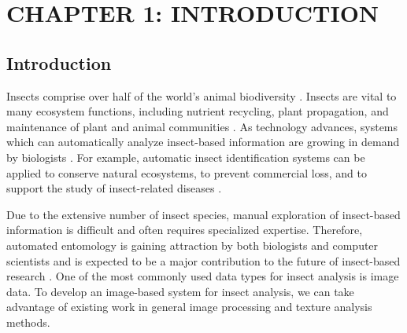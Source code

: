 \documentclass[12pt]{article}
\begin{document}
\begin{center}
    \listoffigures
\end{center}
\newpage

\begin{center}
    \listoftables
\end{center}
\newpage

\setlength{\parskip}{\baselineskip}

\section{CHAPTER 1: INTRODUCTION}
\subsection{Introduction}

Insects comprise over half of the world's animal biodiversity
\cite{tihelka_evolution_2021}. Insects are vital to many ecosystem functions,
including nutrient recycling, plant propagation, and maintenance of plant and
animal communities \cite{gullan_insects_2009, berenbaum_bugs_1996}. As
technology advances, systems which can automatically analyze insect-based
information are growing in demand by biologists \cite{hassan_advances_2014}. For
example, automatic insect identification systems can be applied to conserve
natural ecosystems, to prevent commercial loss, and to support the study of
insect-related diseases \cite{xia_insect_2018, kaloudis_insect_2005,
    thenmozhi_crop_2019}.

Due to the extensive number of insect species, manual exploration of
insect-based information is difficult and often requires specialized expertise.
Therefore, automated entomology is gaining attraction by both biologists and
computer scientists and is expected to be a major contribution to the future of
insect-based research \cite{martineau_survey_2017}. One of the most commonly
used data types for insect analysis is image data. To develop an image-based
system for insect analysis, we can take advantage of existing work in general
image processing and texture analysis methods.
\end{document}
